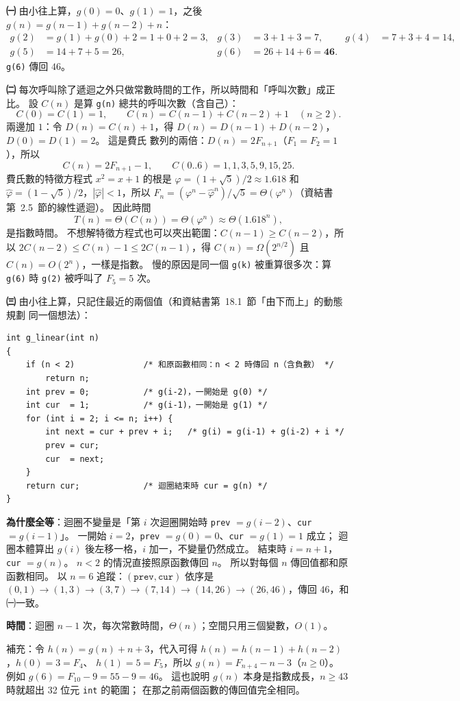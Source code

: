 \begin{pastsoln}
\textbf{㈠} 由小往上算，$g(0) = 0$、$g(1) = 1$，之後 $g(n) = g(n-1) + g(n-2) + n$：
\[
\begin{aligned}
g(2) &= g(1) + g(0) + 2 = 1 + 0 + 2 = 3, & g(3) &= 3 + 1 + 3 = 7, & g(4) &= 7 + 3 + 4 = 14,\\
g(5) &= 14 + 7 + 5 = 26, & g(6) &= 26 + 14 + 6 = \mathbf{46}.
\end{aligned}
\]
\texttt{g(6)} 傳回 $46$。

\textbf{㈡} 每次呼叫除了遞迴之外只做常數時間的工作，所以時間和「呼叫次數」成正比。 設
$C(n)$ 是算 \texttt{g(n)} 總共的呼叫次數（含自己）：
\[
C(0) = C(1) = 1, \qquad C(n) = C(n-1) + C(n-2) + 1 \quad (n \ge 2).
\]
兩邊加 $1$：令 $D(n) = C(n) + 1$，得 $D(n) = D(n-1) + D(n-2)$，$D(0) = D(1) = 2$。 這是費氏
數列的兩倍：$D(n) = 2F_{n+1}$（$F_1 = F_2 = 1$），所以
\[
C(n) = 2F_{n+1} - 1, \qquad C(0..6) = 1, 1, 3, 5, 9, 15, 25 .
\]
費氏數的特徵方程式 $x^2 = x + 1$ 的根是 $\varphi = (1 + \sqrt5)/2 \approx 1.618$ 和
$\hat\varphi = (1 - \sqrt5)/2$，$|\hat\varphi| < 1$，所以 $F_n = (\varphi^n - \hat\varphi^n)/\sqrt5
= \Theta(\varphi^n)$（資結書第~2.5~節的線性遞迴）。 因此時間
\[
T(n) = \Theta(C(n)) = \Theta(\varphi^n) \approx \Theta(1.618^n),
\]
是指數時間。 不想解特徵方程式也可以夾出範圍：$C(n-1) \ge C(n-2)$，所以
$2C(n-2) \le C(n) - 1 \le 2C(n-1)$，得 $C(n) = \Omega(2^{n/2})$ 且 $C(n) = O(2^n)$，一樣是指數。
慢的原因是同一個 \texttt{g(k)} 被重算很多次：算 \texttt{g(6)} 時 \texttt{g(2)} 被呼叫了
$F_5 = 5$ 次。

\textbf{㈢} 由小往上算，只記住最近的兩個值（和資結書第~18.1~節「由下而上」的動態規劃
同一個想法）：
\begin{verbatim}
int g_linear(int n)
{
    if (n < 2)              /* 和原函數相同：n < 2 時傳回 n（含負數） */
        return n;
    int prev = 0;           /* g(i-2)，一開始是 g(0) */
    int cur  = 1;           /* g(i-1)，一開始是 g(1) */
    for (int i = 2; i <= n; i++) {
        int next = cur + prev + i;   /* g(i) = g(i-1) + g(i-2) + i */
        prev = cur;
        cur  = next;
    }
    return cur;             /* 迴圈結束時 cur = g(n) */
}
\end{verbatim}
\textbf{為什麼全等}：迴圈不變量是「第 $i$ 次迴圈開始時 \texttt{prev} $= g(i-2)$、\texttt{cur}
$= g(i-1)$」。 一開始 $i = 2$，\texttt{prev} $= g(0) = 0$、\texttt{cur} $= g(1) = 1$ 成立；
迴圈本體算出 $g(i)$ 後左移一格，$i$ 加一，不變量仍然成立。 結束時 $i = n + 1$，\texttt{cur}
$= g(n)$。 $n < 2$ 的情況直接照原函數傳回 $n$。 所以對每個 $n$ 傳回值都和原函數相同。
以 $n = 6$ 追蹤：$(\texttt{prev}, \texttt{cur})$ 依序是 $(0,1) \to (1,3) \to (3,7) \to (7,14)
\to (14,26) \to (26,46)$，傳回 $46$，和㈠一致。

\textbf{時間}：迴圈 $n - 1$ 次，每次常數時間，$\Theta(n)$；空間只用三個變數，$O(1)$。

補充：令 $h(n) = g(n) + n + 3$，代入可得 $h(n) = h(n-1) + h(n-2)$，$h(0) = 3 = F_4$、
$h(1) = 5 = F_5$，所以 $g(n) = F_{n+4} - n - 3$（$n \ge 0$）。 例如 $g(6) = F_{10} - 9 = 55 - 9
= 46$。 這也說明 $g(n)$ 本身是指數成長，$n \ge 43$ 時就超出 32 位元 \texttt{int} 的範圍；
在那之前兩個函數的傳回值完全相同。
\end{pastsoln}
